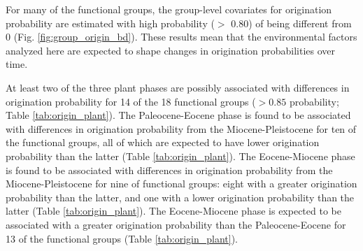 \documentclass[12pt,letterpaper]{article}
\begin{document}
For many of the functional groups, the group-level covariates for origination probability are estimated with high probability (\(>\) 0.80) of being different from 0 (Fig. \ref{fig:group_origin_bd}). These results mean that the environmental factors analyzed here are expected to shape changes in origination probabilities over time. 

At least two of the three plant phases are possibly associated with differences in origination probability for 14 of the 18 functional groups (\(> 0.85\) probability; Table \ref{tab:origin_plant}). The Paleocene-Eocene phase is found to be associated with differences in origination probability from the Miocene-Pleistocene for ten of the functional groups, all of which are expected to have lower origination probability than the latter (Table \ref{tab:origin_plant}). The Eocene-Miocene phase is found to be associated with differences in origination probability from the Miocene-Pleistocene for nine of functional groups: eight with a greater origination probability than the latter, and one with a lower origination probability than the latter (Table \ref{tab:origin_plant}). The Eocene-Miocene phase is expected to be associated with a greater origination probability than the Paleocene-Eocene for 13 of the functional groups (Table \ref{tab:origin_plant}). 
\end{document}
